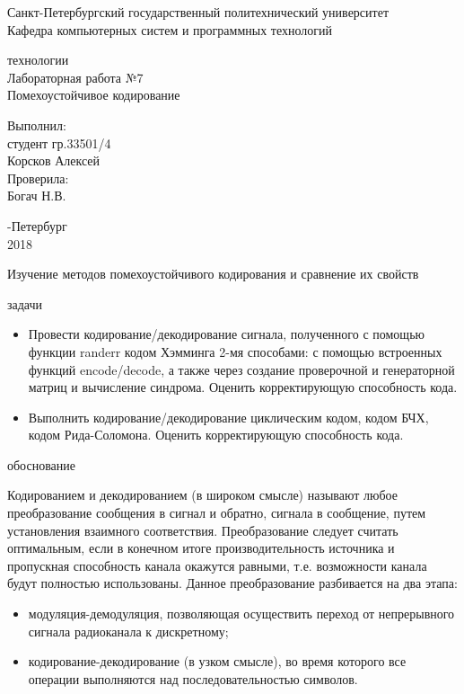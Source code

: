 \documentclass[a4paper,12pt]{article}
\begin{document}
\begin{center}
Санкт-Петербургский государственный политехнический университет
\\Кафедра компьютерных систем и программных технологий
\end{center}
\vspace*{10em plus .6em minus .5em}

\begin{center}
{ технологии
\\Лабораторная работа №7
\\Помехоустойчивое кодирование}
\end{center}

\vspace*{5em plus .6em minus .5em}
\begin{flushright}
Выполнил:\\студент гр.33501/4\\Корсков Алексей\\Проверила:\\Богач Н.В.
\end{flushright}

\vspace*{15em plus .6em minus .5em}
\begin{center}
{-Петербург
\\2018}
\end{center}
\pagestyle{empty}
\newpage
\pagestyle{plain}
{}

Изучение методов помехоустойчивого кодирования и сравнение их свойств

{ задачи}

\begin{itemize}
\item Провести кодирование/декодирование сигнала, полученного с помощью функции randerr кодом Хэмминга 2-мя способами: с помощью встроенных функций encode/decode, а также через создание проверочной и генераторной матриц и вычисление синдрома. Оценить корректирующую способность кода.
\item Выполнить кодирование/декодирование циклическим кодом, кодом БЧХ, кодом Рида-Соломона. Оценить корректирующую способность кода.
\end{itemize}

{ обоснование}

Кодированием и декодированием (в широком смысле) называют любое преобразование сообщения в сигнал и обратно, сигнала в сообщение, путем установления взаимного соответствия. Преобразование следует считать оптимальным, если в конечном итоге производительность источника и пропускная способность канала окажутся равными, т.е. возможности канала будут полностью использованы. Данное преобразование разбивается на два этапа:
\begin{itemize}
\item модуляция-демодуляция, позволяющая осуществить переход от непрерывного сигнала радиоканала к дискретному;
\item кодирование-декодирование (в узком смысле), во время которого все операции выполняются над последовательностью символов.
\end{itemize}
\end{document}
